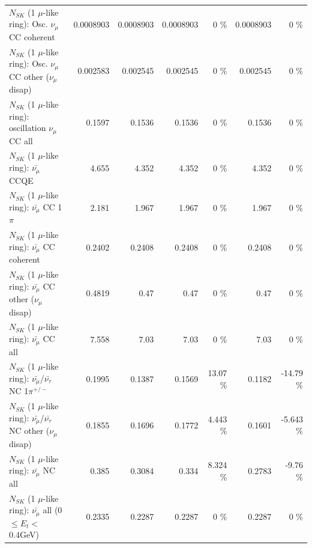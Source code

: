 \begin{table}
\begin{tabular}{| l | r | r | r  r | r  r |}
                        $N_{SK}$ (1 $\mu$-like ring): Osc. $\nu_\mu$ CC coherent &       0.0008903 &       0.0008903 &       0.0008903 &        0 \%  &       0.0008903 &        0 \%  \\ 
         $N_{SK}$ (1 $\mu$-like ring): Osc. $\nu_\mu$ CC other ($\nu_\mu$ disap) &        0.002583 &        0.002545 &        0.002545 &        0 \%  &        0.002545 &        0 \%  \\ 
                      $N_{SK}$ (1 $\mu$-like ring): oscillation $\nu_\mu$ CC all &          0.1597 &          0.1536 &          0.1536 &        0 \%  &          0.1536 &        0 \%  \\ 
\hline
\hline
                              $N_{SK}$ (1 $\mu$-like ring): $\bar{\nu_\mu}$ CCQE &           4.655 &           4.352 &           4.352 &        0 \%  &           4.352 &        0 \%  \\ 
                         $N_{SK}$ (1 $\mu$-like ring): $\bar{\nu_\mu}$ CC 1$\pi$ &           2.181 &           1.967 &           1.967 &        0 \%  &           1.967 &        0 \%  \\ 
                       $N_{SK}$ (1 $\mu$-like ring): $\bar{\nu_\mu}$ CC coherent &          0.2402 &          0.2408 &          0.2408 &        0 \%  &          0.2408 &        0 \%  \\ 
        $N_{SK}$ (1 $\mu$-like ring): $\bar{\nu_\mu}$ CC other ($\nu_\mu$ disap) &          0.4819 &            0.47 &            0.47 &        0 \%  &            0.47 &        0 \%  \\ 
                          $N_{SK}$ (1 $\mu$-like ring): $\bar{\nu_{\mu}}$ CC all &           7.558 &            7.03 &            7.03 &        0 \%  &            7.03 &        0 \%  \\ 
\hline
  $N_{SK}$ (1 $\mu$-like ring): $\bar{\nu_\mu}$/$\bar{\nu_\tau}$ NC 1$\pi^{+/-}$ &          0.1995 &          0.1387 &          0.1569 &    13.07 \%  &          0.1182 &   -14.79 \%  \\ 
$N_{SK}$ (1 $\mu$-like ring): $\bar{\nu_\mu}$/$\bar{\nu_\tau}$ NC other ($\nu_\mu$ disap) &          0.1855 &          0.1696 &          0.1772 &    4.443 \%  &          0.1601 &   -5.643 \%  \\ 
                          $N_{SK}$ (1 $\mu$-like ring): $\bar{\nu_{\mu}}$ NC all &           0.385 &          0.3084 &           0.334 &    8.324 \%  &          0.2783 &    -9.76 \%  \\ 
\hline
   $N_{SK}$ (1 $\mu$-like ring): $\bar{\nu_{\mu}}$ all (0 $\leq E_{t} <$ 0.4GeV) &          0.2335 &          0.2287 &          0.2287 &        0 \%  &          0.2287 &        0 \%  \\ 

\end{tabular}
\end{table}

